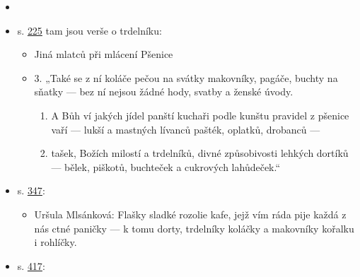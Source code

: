 \begin{itemize}
  \begin{itemize}
  \tightlist
  \item
  \item
    s.
    \href{https://ndk.cz/view/uuid:c0247bb0-d3b5-11dc-b9b7-000d606f5dc6?page=uuid:c4c850d1-41c7-4c42-8940-f42f45196b76}{225}
    tam jsou verše o trdelníku:

    \begin{itemize}
    \tightlist
    \item
      Jiná mlatců při mlácení Pšenice
    \item
      3. „Také se z ní koláče pečou na svátky makovníky, pagáče, buchty
      na sňatky --- bez ní nejsou žádné hody, svatby a ženské úvody.

      \begin{enumerate}
      \tightlist
      \item
        A Bůh ví jakých jídel panští kuchaři podle kunštu pravidel z
        pšenice vaří --- lukší a mastných lívanců pašték, oplatků,
        drobanců ---
      \item
        tašek, Božích milostí a trdelníků, divné způsobivosti lehkých
        dortíků --- bělek, piškotů, buchteček a cukrových lahůdeček.``
      \end{enumerate}
    \end{itemize}
  \item
    s.
    \href{https://ndk.cz/view/uuid:c0247bb0-d3b5-11dc-b9b7-000d606f5dc6?page=uuid:7f1464d8-a54f-4f38-9c1e-70fa4c0285e1}{347}:

    \begin{itemize}
    \tightlist
    \item
      Uršula Mlsánková: Flašky sladké rozolie kafe, jejž vím ráda pije
      každá z nás ctné paničky --- k tomu dorty, trdelníky koláčky a
      makovníky kořalku i rohlíčky.
    \end{itemize}
  \item
    s.
    \href{https://ndk.cz/view/uuid:c0247bb0-d3b5-11dc-b9b7-000d606f5dc6?page=uuid\%3Ada5b6cb7-cfb0-4ebd-b6be-84d59f5e6f72}{417}:


\end{itemize}
\end{itemize}
